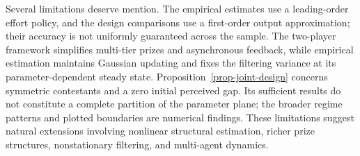 \documentclass[mnsc]{informs3}
\begin{document}
Several limitations deserve mention. The empirical estimates use a leading-order effort policy, and the design comparisons use a first-order output approximation; their accuracy is not uniformly guaranteed across the sample. The two-player framework simplifies multi-tier prizes and asynchronous feedback, while empirical estimation maintains Gaussian updating and fixes the filtering variance at its parameter-dependent steady state. Proposition~\ref{prop-joint-design} concerns symmetric contestants and a zero initial perceived gap. Its sufficient results do not constitute a complete partition of the parameter plane; the broader regime patterns and plotted boundaries are numerical findings. These limitations suggest natural extensions involving nonlinear structural estimation, richer prize structures, nonstationary filtering, and multi-agent dynamics.




%
%
%
\end{document}
